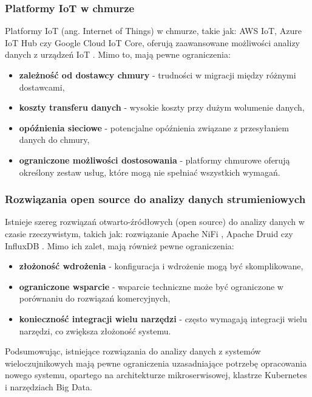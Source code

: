 \subsubsection{Platformy IoT w chmurze}
\label{subsubsec:cloud_iot}

Platformy IoT (ang. Internet of Things) w chmurze, takie jak: AWS IoT, Azure IoT Hub czy Google Cloud IoT Core, oferują zaawansowane możliwości analizy danych z
urządzeń IoT \cite{cloud_iot}. Mimo to, mają pewne ograniczenia:

\begin{itemize}
    \item \textbf{zależność od dostawcy chmury} - trudności w migracji między różnymi dostawcami,
    \item \textbf{koszty transferu danych} - wysokie koszty przy dużym wolumenie danych,
    \item \textbf{opóźnienia sieciowe} - potencjalne opóźnienia związane z przesyłaniem danych do chmury,
    \item \textbf{ograniczone możliwości dostosowania} - platformy chmurowe oferują określony zestaw usług, które mogą nie spełniać wszystkich wymagań.
\end{itemize}

\newpage

\subsubsection{Rozwiązania open source do analizy danych strumieniowych}
\label{subsubsec:open_source}

Istnieje szereg rozwiązań otwarto-źródłowych (open source) do analizy danych w czasie rzeczywistym, takich jak: rozwiązanie Apache NiFi \cite{apache_nifi},
Apache Druid \cite{apache_druid} czy InfluxDB \cite{influxdb}. Mimo ich zalet, mają również pewne ograniczenia:

\begin{itemize}
    \item \textbf{złożoność wdrożenia} - konfiguracja i wdrożenie mogą być skomplikowane,
    \item \textbf{ograniczone wsparcie} - wsparcie techniczne może być ograniczone w porównaniu do rozwiązań komercyjnych,
    \item \textbf{konieczność integracji wielu narzędzi} - często wymagają integracji wielu narzędzi, co zwiększa złożoność systemu.
\end{itemize}

Podsumowując, istniejące rozwiązania do analizy danych z systemów wieloczujnikowych mają pewne ograniczenia uzasadniające potrzebę opracowania nowego systemu, opartego na architekturze mikroserwisowej, klastrze Kubernetes i narzędziach Big Data.